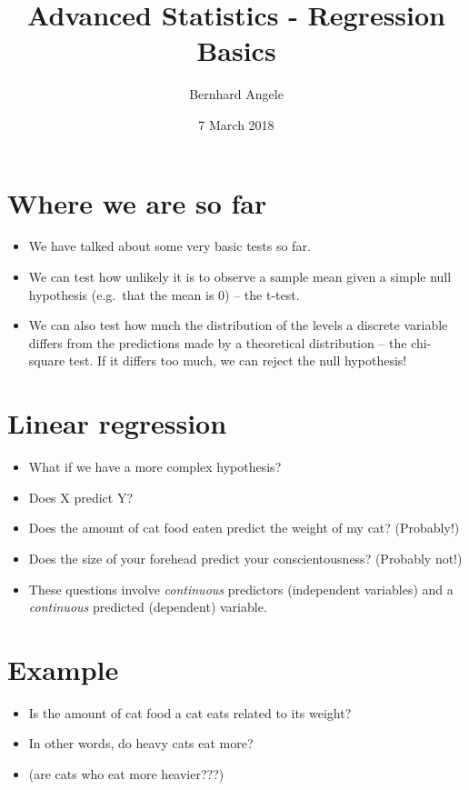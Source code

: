 \documentclass[]{article}
\title{Advanced Statistics - Regression Basics}
\author{Bernhard Angele}
\date{7 March 2018}
\providecommand{\tightlist}{%
  \setlength{\itemsep}{0pt}\setlength{\parskip}{0pt}}
\begin{document}
\maketitle

\section{Where we are so far}\label{where-we-are-so-far}

\begin{itemize}
\tightlist
\item
  We have talked about some very basic tests so far.
\item
  We can test how unlikely it is to observe a sample mean given a simple
  null hypothesis (e.g.~that the mean is 0) -- the t-test.
\item
  We can also test how much the distribution of the levels a discrete
  variable differs from the predictions made by a theoretical
  distribution -- the chi-square test. If it differs too much, we can
  reject the null hypothesis!
\end{itemize}

\section{Linear regression}\label{linear-regression}

\begin{itemize}
\tightlist
\item
  What if we have a more complex hypothesis?
\item
  Does X predict Y?
\item
  Does the amount of cat food eaten predict the weight of my cat?
  (Probably!)
\item
  Does the size of your forehead predict your conscientousness?
  (Probably not!)
\item
  These questions involve \emph{continuous} predictors (independent
  variables) and a \emph{continuous} predicted (dependent) variable.
\end{itemize}

\section{Example}\label{example}

\begin{itemize}
\tightlist
\item
  Is the amount of cat food a cat eats related to its weight?
\item
  In other words, do heavy cats eat more?
\item
  (are cats who eat more heavier???)
\end{itemize}
\end{document}
